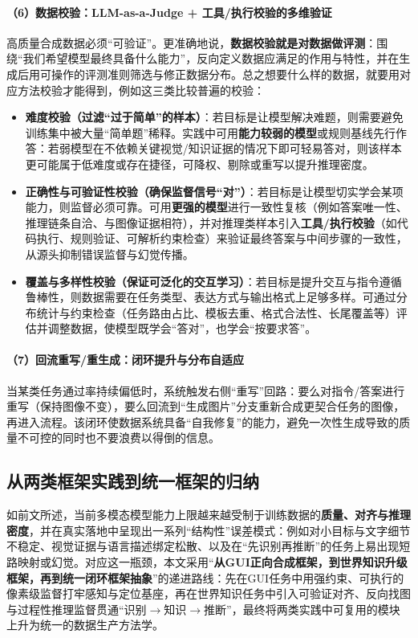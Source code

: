 \paragraph{（6）数据校验：LLM-as-a-Judge + 工具/执行校验的多维验证}
高质量合成数据必须“可验证”。更准确地说，\textbf{数据校验就是对数据做评测}：围绕“我们希望模型最终具备什么能力”，反向定义数据应满足的作用与特性，并在生成后用可操作的评测准则筛选与修正数据分布。总之想要什么样的数据，就要用对应方法校验才能得到，例如这三类比较普遍的校验：
\begin{itemize}
  \item \textbf{难度校验（过滤“过于简单”的样本）}：若目标是让模型解决难题，则需要避免训练集中被大量“简单题”稀释。实践中可用\textbf{能力较弱的模型}或规则基线先行作答：若弱模型在不依赖关键视觉/知识证据的情况下即可轻易答对，则该样本更可能属于低难度或存在捷径，可降权、剔除或重写以提升推理密度。
  \item \textbf{正确性与可验证性校验（确保监督信号“对”）}：若目标是让模型切实学会某项能力，则监督必须可靠。可用\textbf{更强的模型}进行一致性复核（例如答案唯一性、推理链条自洽、与图像证据相符），并对推理类样本引入\textbf{工具/执行校验}（如代码执行、规则验证、可解析约束检查）来验证最终答案与中间步骤的一致性，从源头抑制错误监督与幻觉传播。
  \item \textbf{覆盖与多样性校验（保证可泛化的交互学习）}：若目标是提升交互与指令遵循鲁棒性，则数据需要在任务类型、表达方式与输出格式上足够多样。可通过分布统计与约束检查（任务路由占比、模板去重、格式合法性、长尾覆盖等）评估并调整数据，使模型既学会“答对”，也学会“按要求答”。
\end{itemize}

\paragraph{（7）回流重写/重生成：闭环提升与分布自适应}
当某类任务通过率持续偏低时，系统触发右侧“重写”回路：要么对指令/答案进行重写（保持图像不变），要么回流到“生成图片”分支重新合成更契合任务的图像，再进入流程。该闭环使数据系统具备“自我修复”的能力，避免一次性生成导致的质量不可控的同时也不要浪费以得倒的信息。

\subsection{从两类框架实践到统一框架的归纳}
如前文所述，当前多模态模型能力上限越来越受制于训练数据的\textbf{质量、对齐与推理密度}，并在真实落地中呈现出一系列“结构性”误差模式：例如对小目标与文字细节不稳定、视觉证据与语言描述绑定松散、以及在“先识别再推断”的任务上易出现短路映射或幻觉。对应这一瓶颈，本文采用“\textbf{从GUI正向合成框架，到世界知识升级框架，再到统一闭环框架抽象}”的递进路线：先在GUI任务中用强约束、可执行的像素级监督打牢感知与定位基座，再在世界知识任务中引入可验证对齐、反向找图与过程性推理监督贯通“识别$\rightarrow$知识$\rightarrow$推断”，最终将两类实践中可复用的模块上升为统一的数据生产方法学。


